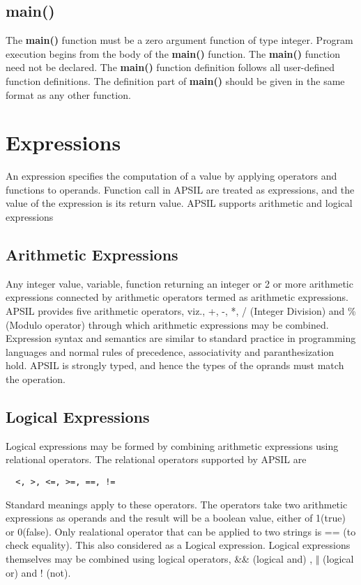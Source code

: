 \subsection{main()}
The \textbf{main()} function must be a zero argument function of type integer. Program execution begins from the body of the \textbf{main()} function. The \textbf{main()} function need not be declared. The \textbf{main()} function definition follows all user-defined function definitions.  The definition part of \textbf{main()} should be given in the same format as any other function.



\section{Expressions}
An expression specifies the computation of a value by applying operators and functions to operands. Function call in APSIL are treated as expressions, and the value of the expression is its return value. APSIL supports arithmetic and logical expressions



\subsection{Arithmetic Expressions}

Any integer value, variable, function returning an integer or 2 or more arithmetic expressions connected by arithmetic operators termed as arithmetic expressions. APSIL provides five arithmetic operators, viz., +, -, *, / (Integer Division) and \% (Modulo operator) through which arithmetic expressions may be combined. Expression syntax and semantics are similar to standard practice in programming languages and normal rules of precedence, associativity and paranthesization hold. APSIL is strongly typed, and hence the types of the oprands must match the operation. 


\subsection{Logical Expressions}

Logical expressions may be formed by combining arithmetic expressions using relational operators. The relational operators supported by APSIL are \begin{verbatim}  <, >, <=, >=, ==, !=
\end{verbatim}
Standard  meanings apply to these operators. The operators take two arithmetic expressions as operands and the result will be a boolean value, either of 1(true) or 0(false). Only realational operator that can be applied to two strings is == (to check equality). This also considered as a Logical expression. Logical expressions themselves may be combined using logical operators, \&\& (logical and) ,  $\Vert$ (logical or) and ! (not).

